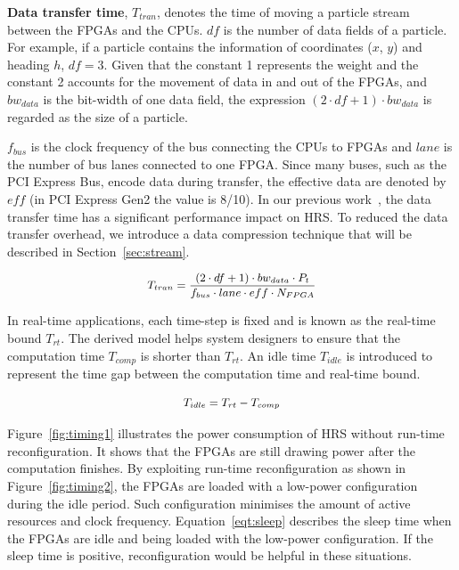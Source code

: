 \textbf{Data transfer time}, $T_{tran}$, denotes the time of moving a particle stream between the FPGAs and the CPUs.
$df$ is the number of data fields of a particle.
For example, if a particle contains the information of coordinates ($x$, $y$) and heading $h$, $df=3$.
Given that the constant 1 represents the weight and the constant 2 accounts for the movement of data in and out of the FPGAs,
and $bw_{data}$ is the bit-width of one data field, the expression $(2 \cdot df + 1) \cdot bw_{data}$ is regarded as the size of a particle.

$f_{bus}$ is the clock frequency of the bus connecting the CPUs to FPGAs and $lane$ is the number of bus lanes connected to one FPGA.
Since many buses, such as the PCI Express Bus, encode data during transfer, the effective data are denoted by $eff$ (in PCI Express Gen2 the value is 8/10).
In our previous work~\cite{chau13a}, the data transfer time has a significant performance impact on HRS.
To reduced the data transfer overhead, we introduce a data compression technique that will be described in Section~\ref{sec:stream}.

\begin{equation}
\small
\begin{aligned}
T_{tran} = \frac{(2 \cdot df + 1) \cdot bw_{data} \cdot P_t}{f_{bus} \cdot lane \cdot eff \cdot N_{FPGA}}
\end{aligned}
\label{eqt:data}
\end{equation}

In real-time applications, each time-step is fixed and is known as the real-time bound $T_{rt}$.
The derived model helps system designers to ensure that the computation time $T_{comp}$ is shorter than $T_{rt}$.
An idle time $T_{idle}$ is introduced to represent the time gap between the computation time and real-time bound.

\begin{equation}
\small
\begin{aligned}
T_{idle} = T_{rt} - T_{comp}
\end{aligned}
\label{eqt:idle}
\end{equation}

Figure~\ref{fig:timing1} illustrates the power consumption of HRS without run-time reconfiguration.
It shows that the FPGAs are still drawing power after the computation finishes.
By exploiting run-time reconfiguration as shown in Figure~\ref{fig:timing2}, the FPGAs are loaded with a low-power configuration during the idle period.
Such configuration minimises the amount of active resources and clock frequency.
Equation~\ref{eqt:sleep} describes the sleep time when the FPGAs are idle and being loaded with the low-power configuration.
If the sleep time is positive, reconfiguration would be helpful in these situations.

